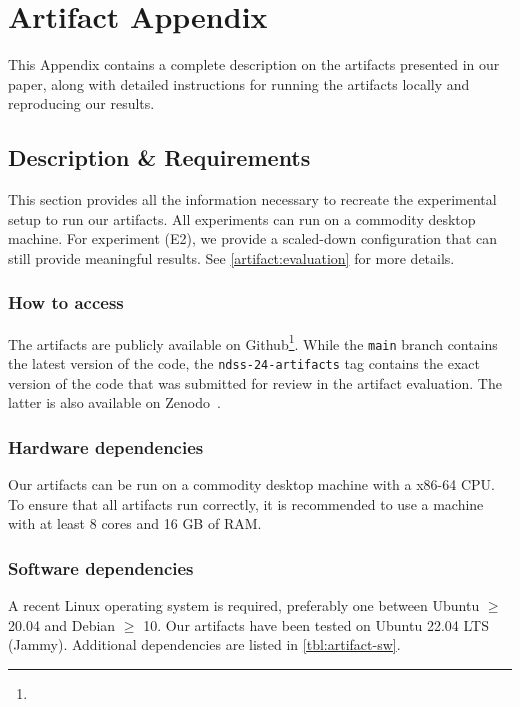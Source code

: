 \section{Artifact Appendix}

This Appendix contains a complete description on the artifacts presented in our
paper, along with detailed instructions for running the artifacts locally and
reproducing our results.

\subsection{Description \& Requirements}
\label{artifact:requirements}



This section provides all the information necessary to recreate the experimental
setup to run our artifacts. All experiments can run on a commodity desktop
machine. For experiment (E2), we provide a scaled-down configuration that can
still provide meaningful results. See \cref{artifact:evaluation} for more
details.

\subsubsection{How to access}
The artifacts are publicly available on Github\footnote{\repo{}}. While the
\texttt{main} branch contains the latest version of the code, the
\texttt{ndss-24-artifacts} tag contains the exact version of the code that was
submitted for review in the artifact evaluation. The latter is also available on
Zenodo~\cite{supplMaterial}.

\subsubsection{Hardware dependencies}
Our artifacts can be run on a commodity desktop machine with a x86-64 CPU. To
ensure that all artifacts run correctly, it is recommended to use a machine with
at least 8 cores and 16 GB of RAM.

\subsubsection{Software dependencies} 
A recent Linux operating system is required, preferably one between Ubuntu
$\geq$ 20.04 and Debian $\geq$ 10. Our artifacts have been tested on Ubuntu
22.04 LTS (Jammy). Additional dependencies are listed in \cref{tbl:artifact-sw}.


